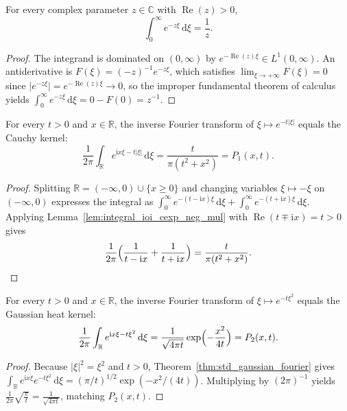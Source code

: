\begin{lemma}\label{lem:integral_ioi_cexp_neg_mul}
\leanok
For every complex parameter $z \in \mathbb{C}$ with $\operatorname{Re}(z) > 0$,
\[
  \int_0^\infty e^{-z \xi}\, \mathrm{d}\xi = \frac{1}{z}.
\]
\end{lemma}

\begin{proof}
\leanok
The integrand is dominated on $(0, \infty)$ by $e^{-\operatorname{Re}(z)\xi} \in L^1(0, \infty)$. An antiderivative is $F(\xi) = (-z)^{-1} e^{-z\xi}$, which satisfies $\lim_{\xi \to +\infty} F(\xi) = 0$ since $\lvert e^{-z\xi} \rvert = e^{-\operatorname{Re}(z)\xi} \to 0$, so the improper fundamental theorem of calculus yields $\int_0^\infty e^{-z\xi}\, \mathrm{d}\xi = 0 - F(0) = z^{-1}$.
\end{proof}

\begin{theorem}\label{thm:fourier_inv_cauchy}
\leanok
For every $t > 0$ and $x \in \mathbb{R}$, the inverse Fourier transform of $\xi \mapsto e^{-t \lvert \xi \rvert}$ equals the Cauchy kernel:
\[
  \frac{1}{2\pi} \int_{\mathbb{R}} e^{\mathrm{i} x \xi - t \lvert \xi \rvert}\, \mathrm{d}\xi = \frac{t}{\pi (t^2 + x^2)} = P_1(x, t).
\]
\end{theorem}

\begin{proof}
\leanok
Splitting $\mathbb{R} = (-\infty, 0) \cup \{x \ge 0\}$ and changing variables $\xi \mapsto -\xi$ on $(-\infty, 0)$ expresses the integral as $\int_0^\infty e^{-(t - \mathrm{i} x)\xi}\, \mathrm{d}\xi + \int_0^\infty e^{-(t + \mathrm{i} x)\xi}\, \mathrm{d}\xi$. Applying Lemma~\ref{lem:integral_ioi_cexp_neg_mul} with $\operatorname{Re}(t \mp \mathrm{i} x) = t > 0$ gives
\[
  \frac{1}{2\pi}\Bigl(\frac{1}{t - \mathrm{i} x} + \frac{1}{t + \mathrm{i} x}\Bigr) = \frac{t}{\pi (t^2 + x^2)}.
\]
\end{proof}

\begin{theorem}\label{thm:fourier_inv_gaussian}
\leanok
For every $t > 0$ and $x \in \mathbb{R}$, the inverse Fourier transform of $\xi \mapsto e^{-t \xi^2}$ equals the Gaussian heat kernel:
\[
  \frac{1}{2\pi} \int_{\mathbb{R}} e^{\mathrm{i} x \xi - t \xi^2}\, \mathrm{d}\xi = \frac{1}{\sqrt{4 \pi t}} \exp\Bigl(-\frac{x^2}{4t}\Bigr) = P_2(x, t).
\]
\end{theorem}

\begin{proof}
\leanok
Because $\lvert \xi \rvert^2 = \xi^2$ and $t > 0$, Theorem~\ref{thm:std_gaussian_fourier} gives $\int_{\mathbb{R}} e^{\mathrm{i} x \xi} e^{-t \xi^2}\, \mathrm{d}\xi = (\pi / t)^{1/2} \exp(-x^2 / (4t))$. Multiplying by $(2\pi)^{-1}$ yields $\frac{1}{2\pi}\sqrt{\frac{\pi}{t}} = \frac{1}{\sqrt{4\pi t}}$, matching $P_2(x, t)$.
\end{proof}
